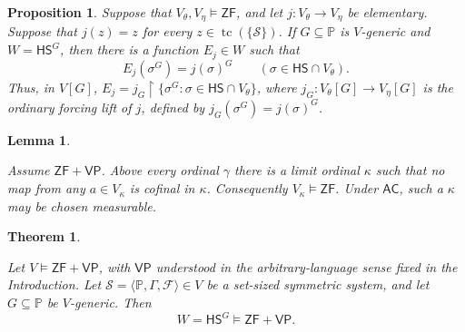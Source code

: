 \documentclass[10pt,a4paper]{amsart}
\newtheorem{proposition}{Proposition}
\newtheorem{lemma}{Lemma}
\newtheorem{theorem}{Theorem}
\newcommand{\AC}{\mathsf{AC}}
\newcommand{\HS}{\mathsf{HS}}
\newcommand{\VP}{\mathsf{VP}}
\newcommand{\ZF}{\mathsf{ZF}}
\newcommand{\restr}{\mathbin{\upharpoonright}}
\newcommand{\tc}{\operatorname{tc}}
\begin{document}
\begin{proposition}\label{prop:symmetric-lift}
Suppose that $V_\theta,V_\eta\models\ZF$, and let $j:V_\theta\to V_\eta$ be elementary.  Suppose that $j(z)=z$ for every $z\in\tc(\{\mathscr S\})$.  If $G\subseteq\mathbb P$ is $V$-generic and $W=\HS^G$, then there is a function $E_j\in W$ such that
\[
E_j(\sigma^G)=j(\sigma)^G\qquad(\sigma\in\HS\cap V_\theta).
\]
Thus, in $V[G]$, $E_j=j_G\restr\{\sigma^G:\sigma\in\HS\cap V_\theta\}$, where $j_G:V_\theta[G]\to V_\eta[G]$ is the ordinary forcing lift of $j$, defined by $j_G(\sigma^G)=j(\sigma)^G$.
\end{proposition}

\begin{lemma}\label{lem:ZF-ranks}

Assume $\ZF+\VP$.  Above every ordinal $\gamma$ there is a limit ordinal $\kappa$ such that no map from any $a\in V_\kappa$ is cofinal in $\kappa$.  Consequently $V_\kappa\models\ZF$.  Under $\AC$, such a $\kappa$ may be chosen measurable.
\end{lemma}

\begin{theorem}\label{thm:preservation}

Let $V\models\ZF+\VP$, with $\VP$ understood in the arbitrary-language sense fixed in the Introduction.  Let $\mathscr S=\langle\mathbb P,\Gamma,\mathcal F\rangle\in V$ be a set-sized symmetric system, and let $G\subseteq\mathbb P$ be $V$-generic.  Then
\[
W=\HS^G\models\ZF+\VP.
\]
\end{theorem}
\end{document}
